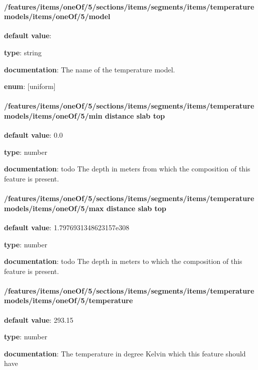 \paragraph{/features/items/oneOf/5/sections/items/segments/items/temperature models/items/oneOf/5/model} \begin{itemized}
\item {\bf default value}: 
\item {\bf type}: string
\item {\bf documentation}: The name of the temperature model.
\item {\bf enum}: [uniform]\end{itemized}\paragraph{/features/items/oneOf/5/sections/items/segments/items/temperature models/items/oneOf/5/min distance slab top} \begin{itemized}
\item {\bf default value}: 0.0
\item {\bf type}: number
\item {\bf documentation}: todo The depth in meters from which the composition of this feature is present.
\end{itemized}\paragraph{/features/items/oneOf/5/sections/items/segments/items/temperature models/items/oneOf/5/max distance slab top} \begin{itemized}
\item {\bf default value}: 1.7976931348623157e308
\item {\bf type}: number
\item {\bf documentation}: todo The depth in meters to which the composition of this feature is present.
\end{itemized}\paragraph{/features/items/oneOf/5/sections/items/segments/items/temperature models/items/oneOf/5/temperature} \begin{itemized}
\item {\bf default value}: 293.15
\item {\bf type}: number
\item {\bf documentation}: The temperature in degree Kelvin which this feature should have

\end{itemized}
